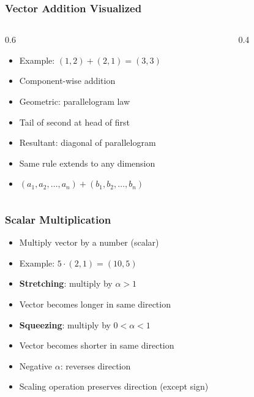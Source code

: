 \begin{frame}[fragile]\frametitle{Vector Addition Visualized}
  \begin{columns}
    \begin{column}[T]{0.6\linewidth}
      \begin{itemize}
        \item Example: $(1,2) + (2,1) = (3,3)$
        \item Component-wise addition
        \item Geometric: parallelogram law
        \item Tail of second at head of first
        \item Resultant: diagonal of parallelogram
        \item Same rule extends to any dimension
        \item $(a_1, a_2, \ldots, a_n) + (b_1, b_2, \ldots, b_n)$
      \end{itemize}
    \end{column}
    \begin{column}[T]{0.4\linewidth}
      \begin{center}
      \end{center}
    \end{column}
  \end{columns}
\end{frame}

\begin{frame}[fragile]\frametitle{Scalar Multiplication}
  \begin{itemize}
    \item Multiply vector by a number (scalar)
    \item Example: $5 \cdot (2,1) = (10,5)$
    \item \textbf{Stretching}: multiply by $\alpha > 1$
    \item Vector becomes longer in same direction
    \item \textbf{Squeezing}: multiply by $0 < \alpha < 1$
    \item Vector becomes shorter in same direction
    \item Negative $\alpha$: reverses direction
    \item Scaling operation preserves direction (except sign)
  \end{itemize}
\end{frame}


